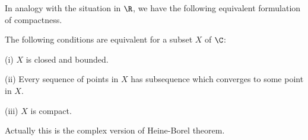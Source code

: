 

In analogy with the situation in $\R$, we have the following equivalent formulation of compactness.


\begin{theorem}\label{thm:complex_set_is_compact_iff_bounded_and_closed}
The following conditions are equivalent for a subset $X$ of $\C$:
\ben
\item [(i)] $X$ is closed and bounded.
\item [(ii)] Every sequence of points in $X$ has subsequence which converges to some point in $X$.
\item [(iii)] $X$ is compact.
\een
\end{theorem}

\begin{remark}
Actually this is the complex version of Heine-Borel theorem.
\end{remark}


